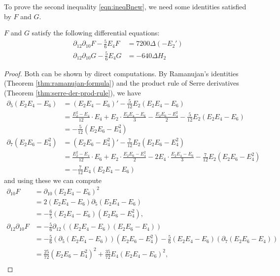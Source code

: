 To prove the second inequality \eqref{eqn:ineqBnew}, we need some identities satisfied by $F$ and $G$.
\begin{lemma}\label{lemma:F-G-de}
$F$ and $G$ satisfy the following differential equations:
\begin{align}
    \partial_{12}\partial_{10} F - \frac{5}{6} E_{4} F &= 7200 \Delta (-E_{2}') \label{eqn:ddf} \\
    \partial_{12}\partial_{10} G - \frac{5}{6} E_{4} G &= -640 \Delta H_{2} \label{eqn:ddg}
\end{align}
\end{lemma}
\begin{proof}
Both can be shown by direct computations.
By Ramanujan's identities (Theorem \ref{thm:ramanujan-formula}) and the product rule of Serre derivatives (Theorem \ref{thm:serre-der-prod-rule}), we have
\begin{align}
  \partial_{5} (E_2 E_4 - E_6) &= (E_2 E_4 - E_6)' - \frac{5}{12} E_2 (E_2 E_4 - E_6) \\
  &= \frac{E_2^2 - E_4}{12} \cdot E_4 + E_2 \cdot \frac{E_2 E_4 - E_6}{3} - \frac{E_2 E_6 - E_4^2}{2} - \frac{5}{12}E_2 (E_2 E_4 - E_6) \\
  &= -\frac{5}{12} (E_2 E_6 - E_4^2) \label{eqn:S5} \\
  \partial_{7} (E_2 E_6 - E_4^2) &= (E_2 E_6 - E_4^2)' - \frac{7}{12} E_2 (E_2 E_6 - E_4^2) \\
  &= \frac{E_2^2 - E_4}{12} \cdot E_6 + E_2 \cdot \frac{E_2 E_6 - E_4^2}{2} - 2 E_4 \cdot \frac{E_2 E_4 - E_6}{3} - \frac{7}{12} E_2 (E_2 E_6 - E_4^2) \\
  &= -\frac{7}{12} E_4 (E_2 E_4 - E_6) \label{eqn:S7}
\end{align}
and using these we can compute
\begin{align}
  \partial_{10} F &= \partial_{10} (E_2 E_4 - E_6)^2 \\
  &= 2 (E_2 E_4 - E_6) \partial_{5} (E_2 E_4 - E_6) \\
  &= -\frac{6}{5} (E_2 E_4 - E_6) (E_2 E_6 - E_4^2), \\
  \partial_{12}\partial_{10} F &= -\frac{5}{6} \partial_{12} ((E_2 E_4 - E_6) (E_2 E_6 - E_4)) \\
  &= -\frac{5}{6} (\partial_{5}(E_2 E_4 - E_6)) (E_2 E_6 - E_4^2) - \frac{5}{6} (E_2 E_4 - E_6) (\partial_{7} (E_2 E_6 - E_4)) \\
  &= \frac{25}{72} (E_2 E_6 - E_4^2)^2 + \frac{35}{72} E_4 (E_2 E_4 - E_6)^2, \\

\end{align}
\end{proof}
